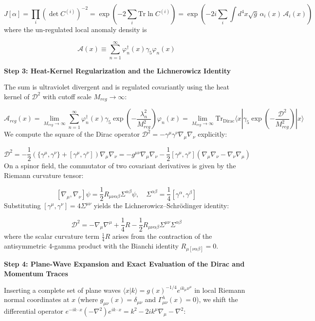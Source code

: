 \documentclass[aps,prd,onecolumn,superscriptaddress,nofootinbib,longbibliography,10pt]{revtex4-2}
\begin{document}
  \[ J[\alpha] = \prod_i \left(\det C^{(i)}\right)^{-2} = \exp\left(-2\sum_i \text{Tr}\ln C^{(i)}\right) = \exp\left(-2i\sum_i \int d^4x\sqrt{g}\,\alpha_i(x)\,\mathcal{A}_i(x)\right) \]
  where the un-regulated local anomaly density is


  \[ \mathcal{A}(x) \equiv \sum_{n=1}^\infty \varphi_n^\dagger(x)\gamma_5\varphi_n(x) \]

  \textbf{Step 3: Heat-Kernel Regularization and the Lichnerowicz Identity}


  The sum is ultraviolet divergent and is regulated covariantly using the heat kernel of \(\mathcal{D}^2\) with cutoff scale \(M_{reg} \to \infty\):


  \[ \mathcal{A}_{reg}(x) = \lim_{M_{reg}\to\infty}\sum_{n=1}^\infty \varphi_n^\dagger(x)\gamma_5\exp\left(-\frac{\lambda_n^2}{M_{reg}^2}\right)\varphi_n(x) = \lim_{M_{reg}\to\infty}\text{Tr}_{\text{Dirac}}\langle x | \gamma_5\exp\left(-\frac{\mathcal{D}^2}{M_{reg}^2}\right) | x\rangle \]
  We compute the square of the Dirac operator \(\mathcal{D}^2 = -\gamma^\mu\gamma^\nu\nabla_\mu\nabla_\nu\) explicitly:


  \[ \mathcal{D}^2 = -\frac{1}{2}\left(\{\gamma^\mu,\gamma^\nu\} + [\gamma^\mu,\gamma^\nu]\right)\nabla_\mu\nabla_\nu = -g^{\mu\nu}\nabla_\mu\nabla_\nu - \frac{1}{2}[\gamma^\mu,\gamma^\nu](\nabla_\mu\nabla_\nu - \nabla_\nu\nabla_\mu) \]
  On a spinor field, the commutator of two covariant derivatives is given by the Riemann curvature tensor:


  \[ [\nabla_\mu, \nabla_\nu]\psi = \frac{1}{2}R_{\mu\nu\alpha\beta}\Sigma^{\alpha\beta}\psi, \quad \Sigma^{\alpha\beta} = \frac{1}{4}[\gamma^\alpha,\gamma^\beta] \]
  Substituting \([\gamma^\mu,\gamma^\nu] = 4\Sigma^{\mu\nu}\) yields the Lichnerowicz–Schrödinger identity:


  \[ \mathcal{D}^2 = -\nabla_\mu\nabla^\mu + \frac{1}{4}R - \frac{1}{2}R_{\mu\nu\alpha\beta}\Sigma^{\mu\nu}\Sigma^{\alpha\beta} \]
  where the scalar curvature term \(\frac{1}{4}R\) arises from the contraction of the antisymmetric 4-gamma product with the Bianchi identity \(R_{\mu[\nu\alpha\beta]} = 0\).



  \textbf{Step 4: Plane-Wave Expansion and Exact Evaluation of the Dirac and Momentum Traces}


  Inserting a complete set of plane waves \(\langle x|k\rangle = g(x)^{-1/4}e^{ik_\mu x^\mu}\) in local Riemann normal coordinates at \(x\) (where \(g_{\mu\nu}(x) = \delta_{\mu\nu}\) and \(\Gamma_{\mu\nu}^\lambda(x) = 0\)), we shift the differential operator \(e^{-ik\cdot x}(-\nabla^2)e^{ik\cdot x} = k^2 - 2ik^\mu\nabla_\mu - \nabla^2\):
\end{document}
